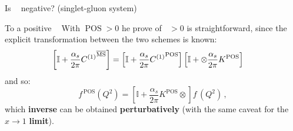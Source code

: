 \documentclass[8pt]{beamer}
\DeclareMathOperator{\msbar}{\overline{MS}}
\DeclareMathOperator{\pos}{POS}
\begin{document}
\begin{frame}{Is $\msbar$ negative? (singlet-gluon system)}
\begin{block}{To a positive $\msbar$}
    With $\pos > 0$ he prove of $\msbar > 0$ is straightforward, since the
    explicit transformation between the two schemes is known:
    \begin{equation*}
        \hspace*{-12pt}\left[\mathbb{I}
        +\frac{\alpha_s}{2\pi} {C^{(1)}}^{\msbar}\right]=\left[\mathbb{I}
          +\frac{\alpha_s}{2\pi} {C^{(1)}}^{\pos}
          \right]\left[\mathbb{I}
          + \otimes \frac{\alpha_s}{2\pi}  K^{\pos}\right]
    \end{equation*}
    and so:
    \begin{equation*}
     f^{\,\pos}(Q^2)=\left[\mathbb{I}
      +\frac{\alpha_s}{2\pi}  K^{\pos}\otimes\right] f^{\,\msbar}(Q^2)\,,
    \end{equation*}
    which \textbf{inverse} can be obtained \textbf{perturbatively} (with the
    same caveat for the $x \to 1$ \textbf{limit}).
    \end{block}
\end{frame}
\end{document}
